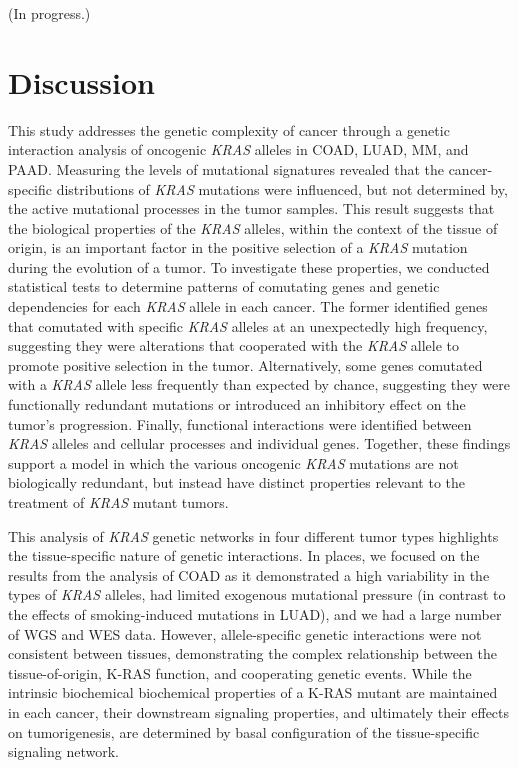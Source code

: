 \documentclass[english, 10pt, letterpaper]{article}
\newcommand{\KRAS}{\emph{KRAS}}
\newcommand{\kras}{K-RAS}
\begin{document}
(In progress.)





\section*{Discussion}

This study addresses the genetic complexity of cancer through a genetic interaction analysis of oncogenic \KRAS{} alleles in COAD, LUAD, MM, and PAAD. 
Measuring the levels of mutational signatures revealed that the cancer-specific distributions of \KRAS{} mutations were influenced, but not determined by, the active mutational processes in the tumor samples.
This result suggests that the biological properties of the \KRAS{} alleles, within the context of the tissue of origin, is an important factor in the positive selection of a \KRAS{} mutation during the evolution of a tumor.
To investigate these properties, we conducted statistical tests to determine patterns of comutating genes and genetic dependencies for each \KRAS{} allele in each cancer.
The former identified genes that comutated with specific \KRAS{} alleles at an unexpectedly high frequency, suggesting they were alterations that cooperated with the \KRAS{} allele to promote positive selection in the tumor.
Alternatively, some genes comutated with a \KRAS{} allele less frequently than expected by chance, suggesting they were functionally redundant mutations or introduced an inhibitory effect on the tumor's progression.
Finally, functional interactions were identified between \KRAS{} alleles and cellular processes and individual genes.
Together, these findings support a model in which the various oncogenic \KRAS{} mutations are not biologically redundant, but instead have distinct properties relevant to the treatment of \KRAS{} mutant tumors.

This analysis of \KRAS{} genetic networks in four different tumor types highlights the tissue-specific nature of genetic interactions. 
In places, we focused on the results from the analysis of COAD as it demonstrated a high variability in the types of \KRAS{} alleles, had limited exogenous mutational pressure (in contrast to the effects of smoking-induced mutations in LUAD), and we had a large number of WGS and WES data.
However, allele-specific genetic interactions were not consistent between tissues, demonstrating the complex relationship between the tissue-of-origin, \kras{} function, and cooperating genetic events.
While the intrinsic biochemical biochemical properties of a \kras{} mutant are maintained in each cancer, their downstream signaling properties, and ultimately their effects on tumorigenesis, are determined by basal configuration of the tissue-specific signaling network.
\end{document}
